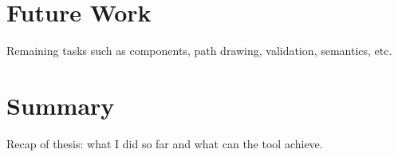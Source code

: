
\section{Future Work}

Remaining tasks such as components, path drawing, validation, semantics, etc.

\section{Summary}

Recap of thesis: what I did so far and what can the tool achieve.
